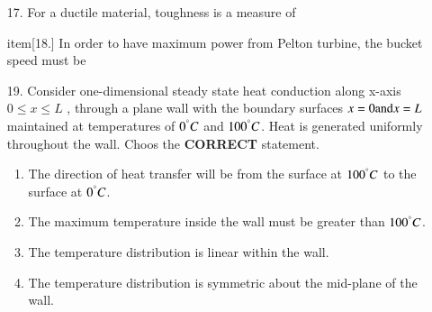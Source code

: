 \documentclass[journal,12pt,onecolumn]{IEEEtran}
\theoremstyle{remark}
\begin{document}
\begin{enumerate}
    \item[17.] For a ductile material, toughness is a measure of
        \hfill{}
        \begin{enumerate}
        \end{enumerate}

        item[18.] In order to have maximum power from Pelton turbine, the bucket speed must be
        \hfill{}
        \begin{enumerate}
        \end{enumerate}


    \item[19.]  Consider one-dimensional steady state heat conduction along x-axis $0 \le x \le L$
        , through a plane wall with the boundary surfaces $x = 0 \textnormal{and} x = L$ maintained
        at temperatures of $0^{\degree}C$ and $100^{\degree}C$. Heat is generated uniformly throughout
        the wall. Choos the \textbf{CORRECT} statement.

        \hfill{}
        \begin{enumerate}
            \item The direction of heat transfer will be from the surface at $100^{\degree}C$ to the surface at $0^{\degree}C$.
            \item The maximum temperature inside the wall must be greater than $100^{\degree}C$.
            \item The temperature distribution is linear within the wall.
            \item The temperature distribution is symmetric about the mid-plane of the wall.
        \end{enumerate}



\end{enumerate}
\end{document}
